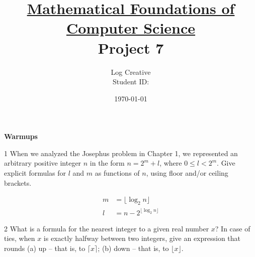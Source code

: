 \documentclass[a4paper,12pt]{article}
\title{\small \underline{Mathematical Foundations of Computer Science}\\\Large Project 7}
\author{Log Creative\\\small Student ID: }
\date{\today}
\makeatletter
\newtheorem*{solution}{Solution}
\theoremstyle{definition}
\renewenvironment{solution}[1][Solution] {\par\pushQED{\qed}\normalfont\topsep6\p@\@plus6\p@\relax\trivlist\item[\hskip\labelsep\bfseries#1\@addpunct{.}]\ignorespaces}{\popQED\endtrivlist\@endpefalse} \makeatother
\newenvironment{problems}{\begin{list}{}{\renewcommand{\makelabel}[1]{\textbf{##1}\hfil}}}{\end{list}}
\makeatother
\begin{document}
\maketitle

\noindent\textbf{Warmups}

\begin{problems}
    \item[1] When we analyzed the Josephus problem in Chapter 1, we represented an arbitrary positive integer $n$ in the form $n=2^m+l$, where $0\leq l < 2^m$. Give explicit formulas for $l$ and $m$ as functions of $n$, using floor and/or ceiling brackets.
    \begin{solution}
        \begin{align*}
            m &= \lfloor \log_2 n \rfloor\\
            l &= n - 2^{\lfloor \log_2 n\rfloor}
        \end{align*}  
    \end{solution} 
    
    \item[2] What is a formula for the nearest integer to a given real number $x$? In case of ties, when $x$ is exactly halfway between two integers, give an expression that rounds (a) up -- that is, to $\lceil x\rceil$; (b) down -- that is, to $\lfloor x\rfloor$.
    

\end{problems}
\end{document}
